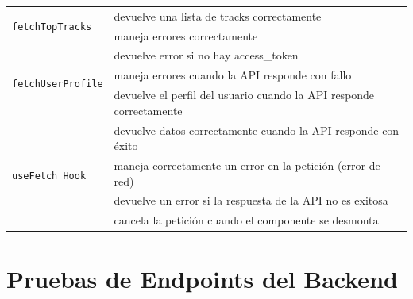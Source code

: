 \begin{longtable}{|p{5cm}|p{9cm}|}
  \multirow{2}{*}{\texttt{fetchTopTracks}}   & devuelve una lista de tracks correctamente                                    \\ \cline{2-2}
                                             & maneja errores correctamente                                                  \\ \hline


  \multirow{3}{*}{\texttt{fetchUserProfile}} & devuelve error si no hay access\_token                                        \\ \cline{2-2}
                                             & maneja errores cuando la API responde con fallo                               \\ \cline{2-2}
                                             & devuelve el perfil del usuario cuando la API responde correctamente           \\ \hline


  \multirow{4}{*}{\texttt{useFetch Hook}}    & devuelve datos correctamente cuando la API responde con éxito                 \\ \cline{2-2}
                                             & maneja correctamente un error en la petición (error de red)                   \\ \cline{2-2}
                                             & devuelve un error si la respuesta de la API no es exitosa                     \\ \cline{2-2}
                                             & cancela la petición cuando el componente se desmonta                          \\ \hline
\end{longtable}

\section{Pruebas de Endpoints del Backend}

